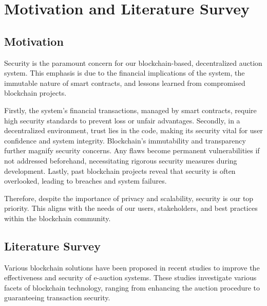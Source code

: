 \documentclass[conference]{IEEEtran}
\begin{document}
\section{Motivation and Literature Survey}

\subsection{Motivation}

Security is the paramount concern for our blockchain-based, decentralized auction system. This emphasis is due to the financial implications of the system, the immutable nature of smart contracts, and lessons learned from compromised blockchain projects.

Firstly, the system's financial transactions, managed by smart contracts, require high security standards to prevent loss or unfair advantages. Secondly, in a decentralized environment, trust lies in the code, making its security vital for user confidence and system integrity\cite{zachariadisGovernanceControlDistributed2019}. Blockchain's immutability and transparency further magnify security concerns. Any flaws become permanent vulnerabilities if not addressed beforehand, necessitating rigorous security measures during development. Lastly, past blockchain projects reveal that security is often overlooked, leading to breaches and system failures\cite{hwangGapTheoryPractice2020}.

Therefore, despite the importance of privacy and scalability, security is our top priority. This aligns with the needs of our users, stakeholders, and best practices within the blockchain community.


\subsection{Literature Survey}

Various blockchain solutions have been proposed in recent studies to improve the effectiveness and security of e-auction systems. These studies investigate various facets of blockchain technology, ranging from enhancing the auction procedure to guaranteeing transaction security.
\end{document}
